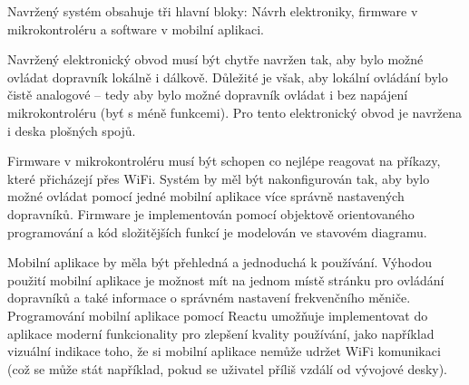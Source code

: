 Navržený systém obsahuje tři hlavní bloky: Návrh elektroniky, firmware v mikrokontroléru a software v mobilní aplikaci.

Navržený elektronický obvod musí být chytře navržen tak, aby bylo možné ovládat dopravník lokálně i dálkově. Důležité je však, aby lokální ovládání bylo čistě analogové – tedy aby bylo možné dopravník ovládat i bez napájení mikrokontroléru (byť s méně funkcemi). Pro tento elektronický obvod je navržena i deska plošných spojů.

Firmware v mikrokontroléru musí být schopen co nejlépe reagovat na příkazy, které přicházejí přes WiFi. Systém by měl být nakonfigurován tak, aby bylo možné ovládat pomocí jedné mobilní aplikace více správně nastavených dopravníků. Firmware je implementován pomocí objektově orientovaného programování a kód složitějších funkcí je modelován ve stavovém diagramu.

Mobilní aplikace by měla být přehledná a jednoduchá k používání. Výhodou použití mobilní aplikace je možnost mít na jednom místě stránku pro ovládání dopravníků a také informace o správném nastavení frekvenčního měniče. Programování mobilní aplikace pomocí Reactu umožňuje implementovat do aplikace moderní funkcionality pro zlepšení kvality používání, jako například vizuální indikace toho, že si mobilní aplikace nemůže udržet WiFi komunikaci (což se může stát například, pokud se uživatel příliš vzdálí od vývojové desky).

%
%
